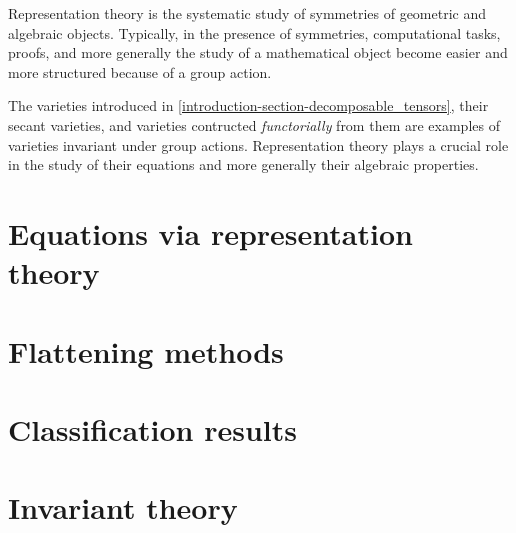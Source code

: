 Representation theory is the systematic study of symmetries of geometric and algebraic objects. Typically, in the presence of symmetries, computational tasks, proofs, and more generally the study of a mathematical object become easier and more structured because of a group action.

The varieties introduced in \ref{introduction-section-decomposable_tensors}, their secant varieties, and varieties contructed \emph{functorially} from them are examples of varieties invariant under group actions. Representation theory plays a crucial role in the study of their equations and more generally their algebraic properties.

\chapter{Equations via representation theory}
\label{RepTheory-chapter-equations}


\chapter{Flattening methods}
\label{RepTheory-chapter-flattenings}


\chapter{Classification results}
\label{RepTheory-chapter-classifications}


\chapter{Invariant theory}
\label{RepTheory-chapter-invariantTheory}

